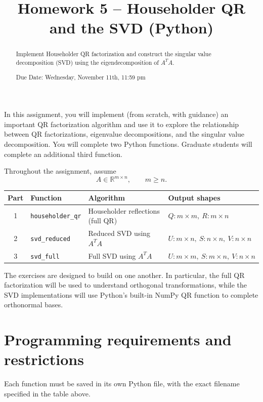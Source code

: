 \documentclass{ximera}
\begin{document}
\title{Homework 5 -- Householder QR and the SVD (Python)}

\begin{abstract}
Implement Householder QR factorization and construct the singular
value decomposition (SVD) using the eigendecomposition of $A^TA$.

Due Date: Wednesday, November 11th, 11:59 pm
\end{abstract}

\maketitle

In this assignment, you will implement (from scratch, with guidance)
an important QR factorization algorithm and use it to explore the
relationship between QR factorizations, eigenvalue decompositions,
and the singular value decomposition. You will complete two Python
functions. Graduate students will complete an additional third
function.

Throughout the assignment, assume
\[
A\in\mathbb{R}^{m\times n}, \qquad m\geq n.
\]

\begin{center}
\begin{tabular}{|c|l|l|l|}
\hline
Part & Function & Algorithm & Output shapes\\
\hline
1 & \texttt{householder\_qr} &
Householder reflections (full QR) &
$Q:m\times m,\ R:m\times n$\\
\hline
2 & \texttt{svd\_reduced} &
Reduced SVD using $A^TA$ &
$U:m\times n,\ S:n\times n,\ V:n\times n$\\
\hline
3 & \texttt{svd\_full} &
Full SVD using $A^TA$ &
$U:m\times m,\ S:m\times n,\ V:n\times n$\\
\hline
\end{tabular}
\end{center}

The exercises are designed to build on one another. In particular,
the full QR factorization will be used to understand orthogonal
transformations, while the SVD implementations will use Python's
built-in NumPy QR function to complete orthonormal bases.

\section*{Programming requirements and restrictions}

Each function must be saved in its own Python file, with the exact
filename specified in the table above.
\end{document}
